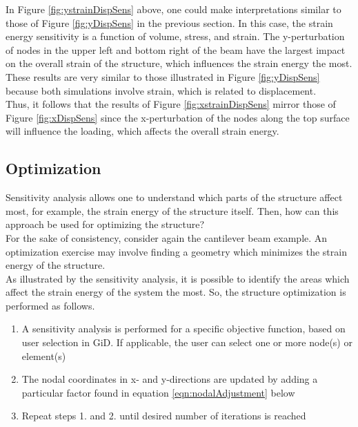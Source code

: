 In Figure \ref{fig:ystrainDispSens} above, one could make interpretations similar to those of Figure \ref{fig:yDispSens} in the previous section. In this case, the strain energy sensitivity is a function of volume, stress, and strain. The y-perturbation of nodes in the upper left and bottom right of the beam have the largest impact on the overall strain of the structure, which influences the strain energy the most. These results are very similar to those illustrated in Figure \ref{fig:yDispSens} because both simulations involve strain, which is related to displacement.\\[3pt]
Thus, it follows that the results of Figure \ref{fig:xstrainDispSens} mirror those of Figure \ref{fig:xDispSens} since the x-perturbation of the nodes along the top surface will influence the loading, which affects the overall strain energy.

\subsection{Optimization} \label{section:optimization}
Sensitivity analysis allows one to understand which parts of the structure affect most, for example, the strain energy of the structure itself. Then, how can this approach be used for optimizing the structure? \\[3pt]
For the sake of consistency, consider again the cantilever beam example. An optimization exercise may involve finding a geometry which minimizes the strain energy of the structure.\\[3pt]
As illustrated by the sensitivity analysis, it is possible to identify the areas which affect the strain energy of the system the most. So, the structure optimization is performed as follows.
\begin{enumerate}
    \item A sensitivity analysis is performed for a specific objective function, based on user selection in GiD. If applicable, the user can select one or more node(s) or element(s)
    \item The nodal coordinates in x- and y-directions are updated by adding a particular factor found in equation \ref{eqn:nodalAdjustment} below
    \item Repeat steps 1. and 2. until desired number of iterations is reached
\end{enumerate}

